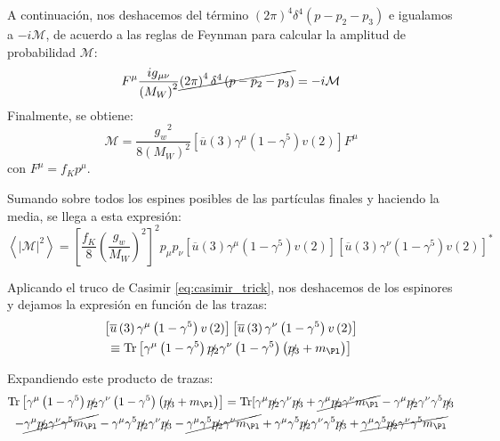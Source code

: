 A continuación, nos deshacemos del término $\left( 2\pi \right) ^{4}\delta ^{4}\left(p-p_{2}-p_{3}\right)$ e igualamos a $-i\mathcal{M}$, de acuerdo a las reglas de Feynman para calcular la amplitud de probabilidad $\mathcal{M}$:
\begin{equation}
[\overline{u}\left( 3\right) \left( \dfrac{-ig_w}{2\sqrt{2}}\right) ^{2}\gamma ^{\mu }\left( 1-\gamma ^{5}\right) v\left( 2\right)]F^{\mu} \dfrac{ig{_{\mu \nu}}}{\left( M_W\right)^{2}}\cancel{\left( 2\pi \right) ^{4}\delta ^{4}\left(p-p_{2}-p_{3}\right)}=-i\mathcal{M}
\end{equation}
Finalmente, se obtiene:
\begin{equation}
\mathcal{M} =\dfrac{{g_{w}}^2}{8\left( M_W\right)^{2}}\left[ \overline{u}\left(3\right) \gamma^{\mu}\left( 1-\gamma ^{5} \right) v\left( 2\right) \right] F^{\mu}
\end{equation}
con $F^{\mu}=f_K p^{\mu}$.

Sumando sobre todos los espines posibles de las partículas finales y haciendo la media, se llega a esta expresión:
\begin{equation}
\left\langle |\mathcal{M}|^{2}\right\rangle=\left[ \dfrac{f_{K}}{8}\left( \dfrac{g_w}{M_W}\right)^{2}\right]^{2} p_{\mu }p_{\nu} \left[ \overline{u}\left( 3\right)\gamma^{\mu}\left( 1-\gamma^{5}\right) v\left( 2\right) \right] \left[ \overline{u}\left( 3\right) \gamma^{\nu} \left( 1-\gamma^{5}\right) v\left( 2\right) \right] ^{\ast }
\end{equation}

Aplicando el truco de Casimir \ref{eq:casimir_trick}, nos deshacemos de los espinores y dejamos la expresión en función de las trazas:
\begin{multline}
\left[ \overline{u}\left( 3\right)\gamma^{\mu}\left( 1-\gamma^{5}\right) v\left( 2\right) \right] \left[ \overline{u}\left( 3\right) \gamma^{\nu }\left( 1-\gamma^{5}\right) v\left( 2\right) \right] \\ \equiv \Tr \left[ \gamma^{\mu } \left(1 -\gamma ^{5}\right) \slashed{p_{2}}\gamma^{\nu }\left( 1-\gamma ^{5}\right) \left( \slashed{p_{3}}+m_{\Pl}\right) \right]
\end{multline}

Expandiendo este producto de trazas:
\begin{multline}
\Tr \left[ \gamma^{\mu } \left(1 -\gamma ^{5}\right) \slashed{p_{2}}\gamma^{\nu }\left( 1-\gamma ^{5}\right) \left( \slashed{p_{3}}+m_{\Pl}\right) \right] = \Tr[ \gamma ^{\mu }\slashed{p_{2}}\gamma ^{\nu }\slashed{p_{3}} + \cancel{\gamma ^{\mu }\slashed{p_{2}}\gamma ^{\nu }m_{\Pl}} -\gamma ^{\mu }\slashed{p_{2}}\gamma ^{\nu }\gamma ^{5}\slashed{p_{3}} \\ - \cancel{\gamma ^{\mu }\slashed{p_{2}}\gamma ^{\nu }\gamma ^{5}m_{\Pl}} -\gamma ^{\mu }\gamma ^{5}\slashed{p_{2}}\gamma ^{\nu }\slashed{p_{3}}- \cancel{\gamma ^{\mu }\gamma ^{5}\slashed{p_{2}}\gamma ^{\nu }m_{\Pl}} +\gamma ^{\mu }\gamma ^{5}\slashed{p_{2}}\gamma ^{\nu }\gamma ^{5}\slashed{p_{3}} + \cancel{\gamma ^{\mu }\gamma ^{5}\slashed{p_{2}}\gamma ^{\nu }\gamma ^{5}m_{\Pl}}
\end{multline}


